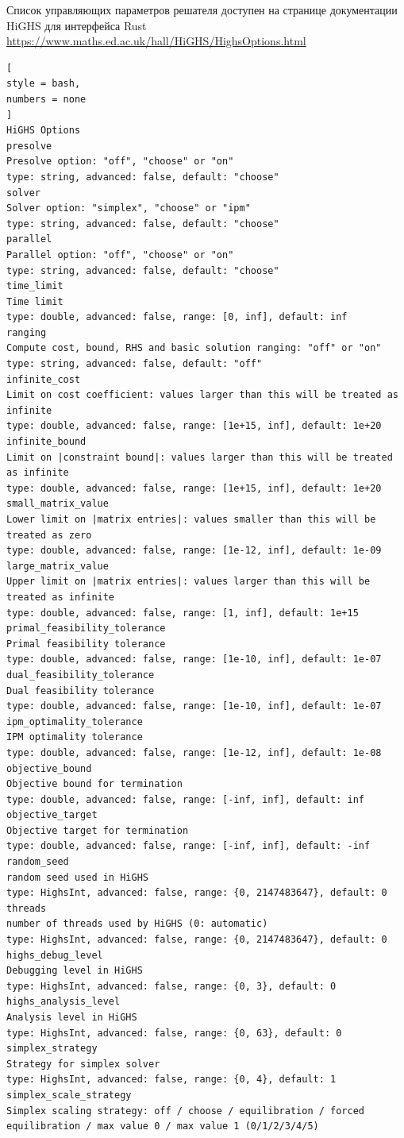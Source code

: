 \documentclass[%
	11pt,
	a4paper,
	utf8,
		]{article}
\begin{document}
Список управляющих параметров решателя доступен на странице документации HiGHS для интерфейса Rust \url{https://www.maths.ed.ac.uk/hall/HiGHS/HighsOptions.html}
\begin{lstlisting}[
style = bash,
numbers = none
]
HiGHS Options
presolve
Presolve option: "off", "choose" or "on"
type: string, advanced: false, default: "choose"
solver
Solver option: "simplex", "choose" or "ipm"
type: string, advanced: false, default: "choose"
parallel
Parallel option: "off", "choose" or "on"
type: string, advanced: false, default: "choose"
time_limit
Time limit
type: double, advanced: false, range: [0, inf], default: inf
ranging
Compute cost, bound, RHS and basic solution ranging: "off" or "on"
type: string, advanced: false, default: "off"
infinite_cost
Limit on cost coefficient: values larger than this will be treated as infinite
type: double, advanced: false, range: [1e+15, inf], default: 1e+20
infinite_bound
Limit on |constraint bound|: values larger than this will be treated as infinite
type: double, advanced: false, range: [1e+15, inf], default: 1e+20
small_matrix_value
Lower limit on |matrix entries|: values smaller than this will be treated as zero
type: double, advanced: false, range: [1e-12, inf], default: 1e-09
large_matrix_value
Upper limit on |matrix entries|: values larger than this will be treated as infinite
type: double, advanced: false, range: [1, inf], default: 1e+15
primal_feasibility_tolerance
Primal feasibility tolerance
type: double, advanced: false, range: [1e-10, inf], default: 1e-07
dual_feasibility_tolerance
Dual feasibility tolerance
type: double, advanced: false, range: [1e-10, inf], default: 1e-07
ipm_optimality_tolerance
IPM optimality tolerance
type: double, advanced: false, range: [1e-12, inf], default: 1e-08
objective_bound
Objective bound for termination
type: double, advanced: false, range: [-inf, inf], default: inf
objective_target
Objective target for termination
type: double, advanced: false, range: [-inf, inf], default: -inf
random_seed
random seed used in HiGHS
type: HighsInt, advanced: false, range: {0, 2147483647}, default: 0
threads
number of threads used by HiGHS (0: automatic)
type: HighsInt, advanced: false, range: {0, 2147483647}, default: 0
highs_debug_level
Debugging level in HiGHS
type: HighsInt, advanced: false, range: {0, 3}, default: 0
highs_analysis_level
Analysis level in HiGHS
type: HighsInt, advanced: false, range: {0, 63}, default: 0
simplex_strategy
Strategy for simplex solver
type: HighsInt, advanced: false, range: {0, 4}, default: 1
simplex_scale_strategy
Simplex scaling strategy: off / choose / equilibration / forced equilibration / max value 0 / max value 1 (0/1/2/3/4/5)

\end{lstlisting}
\end{document}
